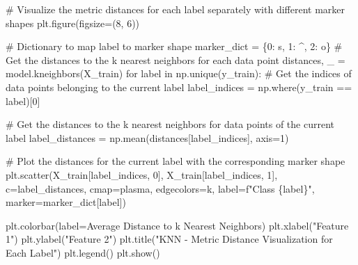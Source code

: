 \documentclass[
  letterpaper,
  DIV=11,
  numbers=noendperiod]{scrreprt}
\newenvironment{Shaded}{\begin{snugshade}}{\end{snugshade}}
\newcommand{\CommentTok}[1]{\textcolor[rgb]{0.37,0.37,0.37}{#1}}
\newcommand{\ControlFlowTok}[1]{\textcolor[rgb]{0.00,0.23,0.31}{#1}}
\newcommand{\DecValTok}[1]{\textcolor[rgb]{0.68,0.00,0.00}{#1}}
\newcommand{\KeywordTok}[1]{\textcolor[rgb]{0.00,0.23,0.31}{#1}}
\newcommand{\NormalTok}[1]{\textcolor[rgb]{0.00,0.23,0.31}{#1}}
\newcommand{\OperatorTok}[1]{\textcolor[rgb]{0.37,0.37,0.37}{#1}}
\newcommand{\SpecialCharTok}[1]{\textcolor[rgb]{0.37,0.37,0.37}{#1}}
\newcommand{\SpecialStringTok}[1]{\textcolor[rgb]{0.13,0.47,0.30}{#1}}
\newcommand{\StringTok}[1]{\textcolor[rgb]{0.13,0.47,0.30}{#1}}
\begin{document}
\begin{Shaded}
\begin{Highlighting}[]
\CommentTok{\# Visualize the metric distances for each label separately with different marker shapes}
\NormalTok{plt.figure(figsize}\OperatorTok{=}\NormalTok{(}\DecValTok{8}\NormalTok{, }\DecValTok{6}\NormalTok{))}

\CommentTok{\# Dictionary to map label to marker shape}
\NormalTok{marker\_dict }\OperatorTok{=}\NormalTok{ \{}\DecValTok{0}\NormalTok{: }\StringTok{\textquotesingle{}s\textquotesingle{}}\NormalTok{, }\DecValTok{1}\NormalTok{: }\StringTok{\textquotesingle{}\^{}\textquotesingle{}}\NormalTok{, }\DecValTok{2}\NormalTok{: }\StringTok{\textquotesingle{}o\textquotesingle{}}\NormalTok{\}}
\CommentTok{\# Get the distances to the k nearest neighbors for each data point}
\NormalTok{distances, \_ }\OperatorTok{=}\NormalTok{ model.kneighbors(X\_train)}
\ControlFlowTok{for}\NormalTok{ label }\KeywordTok{in}\NormalTok{ np.unique(y\_train):}
    \CommentTok{\# Get the indices of data points belonging to the current label}
\NormalTok{    label\_indices }\OperatorTok{=}\NormalTok{ np.where(y\_train }\OperatorTok{==}\NormalTok{ label)[}\DecValTok{0}\NormalTok{]}
    
    \CommentTok{\# Get the distances to the k nearest neighbors for data points of the current label}
\NormalTok{    label\_distances }\OperatorTok{=}\NormalTok{ np.mean(distances[label\_indices], axis}\OperatorTok{=}\DecValTok{1}\NormalTok{)}
    
    \CommentTok{\# Plot the distances for the current label with the corresponding marker shape}
\NormalTok{    plt.scatter(X\_train[label\_indices, }\DecValTok{0}\NormalTok{], X\_train[label\_indices, }\DecValTok{1}\NormalTok{], c}\OperatorTok{=}\NormalTok{label\_distances, cmap}\OperatorTok{=}\StringTok{\textquotesingle{}plasma\textquotesingle{}}\NormalTok{, edgecolors}\OperatorTok{=}\StringTok{\textquotesingle{}k\textquotesingle{}}\NormalTok{, label}\OperatorTok{=}\SpecialStringTok{f"Class }\SpecialCharTok{\{}\NormalTok{label}\SpecialCharTok{\}}\SpecialStringTok{"}\NormalTok{, marker}\OperatorTok{=}\NormalTok{marker\_dict[label])}

\NormalTok{plt.colorbar(label}\OperatorTok{=}\StringTok{\textquotesingle{}Average Distance to k Nearest Neighbors\textquotesingle{}}\NormalTok{)}
\NormalTok{plt.xlabel(}\StringTok{"Feature 1"}\NormalTok{)}
\NormalTok{plt.ylabel(}\StringTok{"Feature 2"}\NormalTok{)}
\NormalTok{plt.title(}\StringTok{"KNN {-} Metric Distance Visualization for Each Label"}\NormalTok{)}
\NormalTok{plt.legend()}
\NormalTok{plt.show()}
\end{Highlighting}
\end{Shaded}
\end{document}
